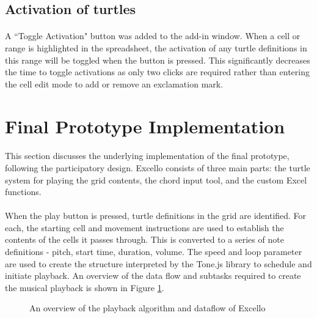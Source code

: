 \subsection{Activation of turtles}

\paragraph{} A ``Toggle Activation" button was added to the add-in window. When a cell or range is highlighted in the spreadsheet, the activation of any turtle definitions in this range will be toggled when the button is pressed.  This significantly decreases the time to toggle activations as only two clicks are required rather than entering the cell edit mode to add or remove an exclamation mark.

\section{Final Prototype Implementation}

\paragraph{} This section discusses the underlying implementation of the final prototype, following the participatory design. Excello consists of three main parts: the turtle system for playing the grid contents, the chord input tool, and the custom Excel functions.

\paragraph{} When the play button is pressed, turtle definitions in the grid are identified. For each, the starting cell and movement instructions are used to establish the contents of the cells it passes through. This is converted to a series of note definitions - pitch, start time, duration, volume. The speed and loop parameter are used to create the structure interpreted by the Tone.js library to schedule and initiate playback. An overview of the data flow and subtasks required to create the musical playback is shown in Figure \ref{fig:overview}.

\begin{figure}[htb]
\begin{center}

\end{center}
\caption{An overview of the playback algorithm and dataflow of Excello\label{fig:overview}}
\end{figure}

